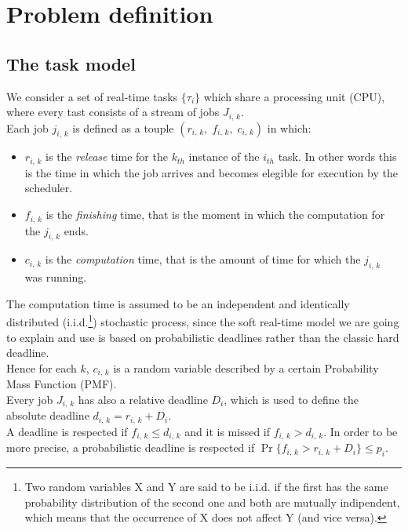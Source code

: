 \chapter{Problem definition}\label{chp:model}


\section{The task model}
We consider a set of real-time tasks \( \{\tau_{i}\} \) which share a processing unit (CPU), where every tast consists of a stream of jobs \( J_{i,\,k} \).\\
Each job \( j_{i,\,k} \) is defined as a touple \( \left(r_{i,\,k}, \;f_{i,\,k}, \;c_{i,\,k}\right) \) in which:

\begin{itemize}
  \item \( r_{i,\,k} \) is the \emph{release} time for the \( k_{th} \) instance of the \( i_{th} \) task. In other words this is the time in which the job arrives and becomes elegible for execution by the scheduler.
  \item \( f_{i,\,k} \) is the \emph{finishing} time, that is the moment in which the computation for the \( j_{i,\,k} \) ends.
  \item \( c_{i,\,k} \) is the \emph{computation} time, that is the amount of time for which the \( j_{i,\,k} \) was running.
\end{itemize} 

The computation time is assumed to be an independent and identically distributed (i.i.d.\footnote{Two random variables X and Y are said to be i.i.d. if the first has the same probability distribution of the second one and both are mutually indipendent, which means that the occurrence of X does not affect Y (and vice versa).}) stochastic process, since the soft real-time model we are going to explain and use is based on probabilistic deadlines rather than the classic hard deadline.\\
Hence for each \( k \), \( c_{i,\,k} \) is a random variable described by a certain Probability Mass Function (PMF).\\
Every job \( J_{i,\,k} \) has also a relative deadline \( D_{i} \), which is used to define the absolute deadline \( d_{i,\,k} = r_{i,\,k} + D_{i} \). \\
A deadline is respected if \( f_{i,\,k} \leq d_{i,\,k} \) and it is missed if \( f_{i,\,k} > d_{i,\,k} \). In order to be more precise, a probabilistic deadline is respected if \( \Pr\{f_{i,\,k} > r_{i,\,k} + D_{i} \} \leq p_{i} \).\\

